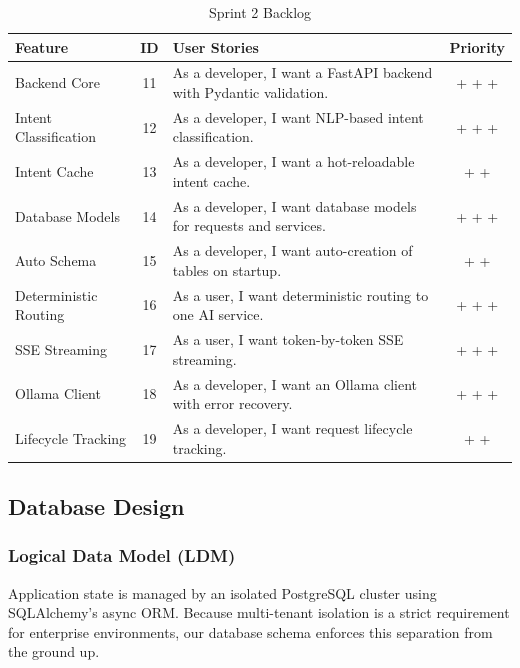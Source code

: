 \begin{table}[H]
\centering
\renewcommand{\arraystretch}{1.3}
\footnotesize
\begin{tabularx}{\textwidth}{| >{\raggedright\arraybackslash}p{3.5cm} | c | >{\raggedright\arraybackslash}X | c |}
\hline
\rowcolor{rowgray}
\textbf{Feature} & \textbf{ID} & \textbf{User Stories} & \textbf{Priority} \\
\hline
Backend Core & 11 & As a developer, I want a FastAPI backend with Pydantic validation. & + + + \\
\hline
Intent Classification & 12 & As a developer, I want NLP-based intent classification. & + + + \\
\hline
Intent Cache & 13 & As a developer, I want a hot-reloadable intent cache. & + + \\
\hline
Database Models & 14 & As a developer, I want database models for requests and services. & + + + \\
\hline
Auto Schema & 15 & As a developer, I want auto-creation of tables on startup. & + + \\
\hline
Deterministic Routing & 16 & As a user, I want deterministic routing to one AI service. & + + + \\
\hline
SSE Streaming & 17 & As a user, I want token-by-token SSE streaming. & + + + \\
\hline
Ollama Client & 18 & As a developer, I want an Ollama client with error recovery. & + + + \\
\hline
Lifecycle Tracking & 19 & As a developer, I want request lifecycle tracking. & + + \\
\hline
\end{tabularx}
\caption{Sprint 2 Backlog}
\label{tab:sprint2_backlog}
\end{table}

\subsection{Database Design}

\subsubsection{Logical Data Model (LDM)}

Application state is managed by an isolated PostgreSQL cluster using SQLAlchemy's async ORM. Because multi-tenant isolation is a strict requirement for enterprise environments, our database schema enforces this separation from the ground up.

